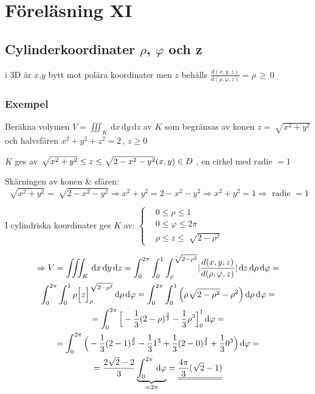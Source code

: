\documentclass[a4paper]{article}
\newcommand{\svar}[1]{\underline{\underline{#1}}}
\DeclarePairedDelimiter \abs{\lvert}{\rvert}
\let\oldsqrt\sqrt
\renewcommand*{\sqrt}[2][\ ]{\oldsqrt[#1]{#2} }
\begin{document}
\newpage
\section{Föreläsning XI}

\subsection{Cylinderkoordinater \texorpdfstring{$\rho$}{rå}, \texorpdfstring{$\varphi$}{phi} och z}

i 3D är $x$,$y$ bytt mot polära koordinater men $z$ behålls $\frac{d(x,y,z)}{d(\rho,\varphi,z)} = \rho \,\geq\, 0$

\subsubsection{Exempel}

Beräkna volymen $V=\iiint_K \,\mathrm{d}x\,\mathrm{d}y\,\mathrm{d}z$ av $K$ som begränsas av konen $z=\sqrt{x^2+y^2}$ och halvsfären $x^2+y^2+z^2 = 2 \,,\, z \geq 0$ \newline

$K$ ges av $\sqrt{x^2+y^2} \leq z \leq \sqrt{2-x^2-y^2} \newline
(x,y) \in D$ , en cirkel med radie $=1$ \newline

Skärningen av konen \& sfären:
$$
	\sqrt{x^2+y^2} = \sqrt{2-x^2-y^2} \Rightarrow
	x^2 + y^2 = 2 - x^2 - y^2 \Rightarrow
	x^2 + y^2 = 1 \Rightarrow
	\text{ radie } = 1
$$

I cylindriska koordinater ges $K$ av:
$\begin{cases}
	&0 \leq \rho \leq 1 \\
	&0 \leq \varphi \leq 2\pi \\
	&\rho \leq z \leq \sqrt{2-\rho^2}
\end{cases}$

\begin{gather*}
	\Rightarrow V = \iiint_K \,\mathrm{d}x\,\mathrm{d}y\,\mathrm{d}z =
	\int_0^{2\pi} \int_0^1 \int_\rho^{\sqrt{2-\rho^2}} \abs{\frac{d(x,y,z)}{d(\rho,\varphi,z)}} \,\mathrm{d}z\,\mathrm{d}\rho\,\mathrm{d}\varphi = \\
	\int_0^{2\pi} \int_0^1 \rho \Big[ z \Big]_\rho^{\sqrt{2-\rho^2}} \,\mathrm{d}\rho\,\mathrm{d}\varphi =
	\int_0^{2\pi} \int_0^1 \Big( \rho\sqrt{2-\rho^2} - \rho^2 \Big) \,\mathrm{d}\rho\,\mathrm{d}\varphi = \\
	= \int_0^{2\pi} \Big[ -\frac{1}{3}(2-\rho)^{\frac{3}{2}} -\frac{1}{3}\rho^3 \Big]_0^1 \,\mathrm{d}\varphi = \\
	= \int_0^{2\pi} \Big( -\frac{1}{3}(2-1)^{\frac{3}{2}} - \frac{1}{3}1^3 + \frac{1}{3}(2-0)^{\frac{3}{2}}+\frac{1}{3}0^3 \Big) \,\mathrm{d}\varphi = \\
	= \frac{2\sqrt{2}-2}{3} \underbrace{\int_0^{2\pi} \,\mathrm{d}\varphi}_{=2\pi} =
	\svar{\frac{4\pi}{3}(\sqrt{2}-1)}
\end{gather*}
\end{document}
